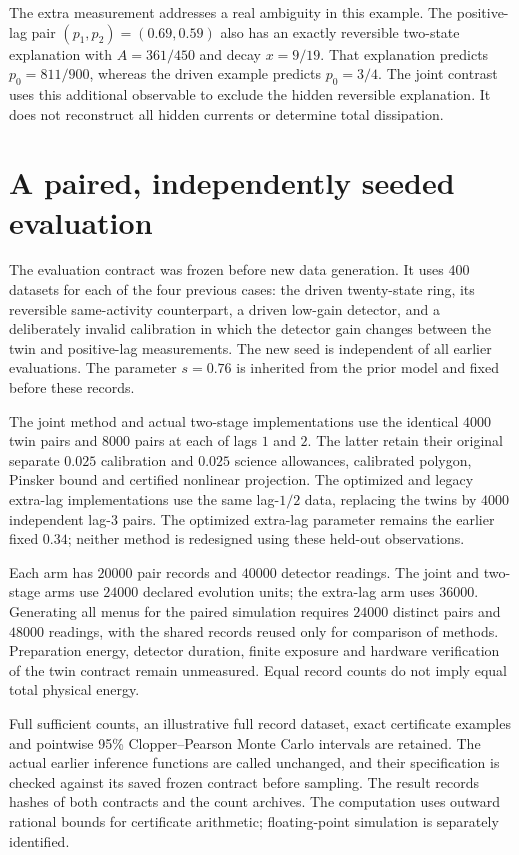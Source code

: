 The extra measurement addresses a real ambiguity in this example. The
positive-lag pair $(p_1,p_2)=(0.69,0.59)$ also has an exactly reversible
two-state explanation with $A=361/450$ and decay $x=9/19$. That explanation
predicts $p_0=811/900$, whereas the driven example predicts $p_0=3/4$.
The joint contrast uses this additional observable to exclude the hidden
reversible explanation. It does not reconstruct all hidden currents or
determine total dissipation.

\section{A paired, independently seeded evaluation}
The evaluation contract was frozen before new data generation. It uses
$400$ datasets for each of the four previous cases: the driven twenty-state
ring, its reversible same-activity counterpart, a driven low-gain detector,
and a deliberately invalid calibration in which the detector gain changes
between the twin and positive-lag measurements. The new seed is independent
of all earlier evaluations. The parameter $s=0.76$ is inherited from the
prior model and fixed before these records.

The joint method and actual two-stage implementations use the identical
$4000$ twin pairs and $8000$ pairs at each of lags $1$ and $2$. The latter
retain their original separate $0.025$ calibration and $0.025$ science
allowances, calibrated polygon, Pinsker bound and certified nonlinear
projection. The optimized and legacy extra-lag implementations use the same
lag-$1/2$ data, replacing the twins by $4000$ independent lag-$3$ pairs.
The optimized extra-lag parameter remains the earlier fixed $0.34$; neither
method is redesigned using these held-out observations.

Each arm has $20000$ pair records and $40000$ detector readings. The joint
and two-stage arms use $24000$ declared evolution units; the extra-lag arm
uses $36000$. Generating all menus for the paired simulation requires
$24000$ distinct pairs and $48000$ readings, with the shared records reused
only for comparison of methods. Preparation energy, detector duration,
finite exposure and hardware verification of the twin contract remain
unmeasured. Equal record counts do not imply equal total physical energy.

Full sufficient counts, an illustrative full record dataset, exact certificate
examples and pointwise 95\% Clopper--Pearson Monte Carlo intervals are
retained. The actual earlier inference functions are called unchanged, and
their specification is checked against its saved frozen contract before
sampling. The result records hashes of both contracts and the count archives.
The computation uses outward rational bounds for certificate arithmetic;
floating-point simulation is separately identified.

